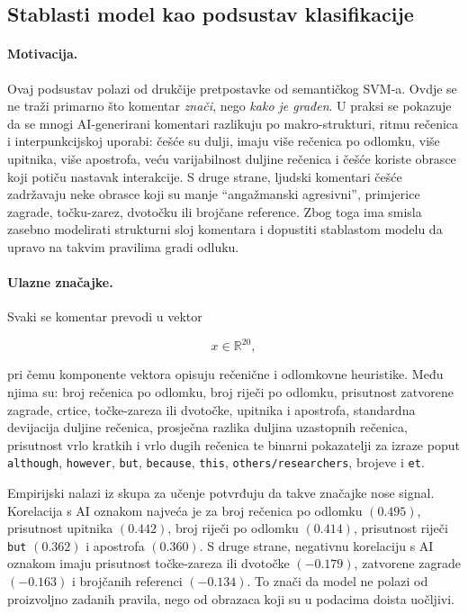 \documentclass{article}
\begin{document}
\subsection{Stablasti model kao podsustav klasifikacije}

\paragraph{Motivacija.}
Ovaj podsustav polazi od drukčije pretpostavke od semantičkog SVM-a. Ovdje se ne traži primarno što komentar \emph{znači}, nego \emph{kako je građen}. U praksi se pokazuje da se mnogi AI-generirani komentari razlikuju po makro-strukturi, ritmu rečenica i interpunkcijskoj uporabi: češće su dulji, imaju više rečenica po odlomku, više upitnika, više apostrofa, veću varijabilnost duljine rečenica i češće koriste obrasce koji potiču nastavak interakcije. S druge strane, ljudski komentari češće zadržavaju neke obrasce koji su manje ``angažmanski agresivni'', primjerice zagrade, točku-zarez, dvotočku ili brojčane reference. Zbog toga ima smisla zasebno modelirati strukturni sloj komentara i dopustiti stablastom modelu da upravo na takvim pravilima gradi odluku.

\paragraph{Ulazne značajke.}
Svaki se komentar prevodi u vektor

\[
x \in \mathbb{R}^{20},
\]

pri čemu komponente vektora opisuju rečenične i odlomkovne heuristike. Među njima su: broj rečenica po odlomku, broj riječi po odlomku, prisutnost zatvorene zagrade, crtice, točke-zareza ili dvotočke, upitnika i apostrofa, standardna devijacija duljine rečenica, prosječna razlika duljina uzastopnih rečenica, prisutnost vrlo kratkih i vrlo dugih rečenica te binarni pokazatelji za izraze poput \texttt{although}, \texttt{however}, \texttt{but}, \texttt{because}, \texttt{this}, \texttt{others/researchers}, brojeve i \texttt{et}.

Empirijski nalazi iz skupa za učenje potvrđuju da takve značajke nose signal. Korelacija s AI oznakom najveća je za broj rečenica po odlomku $(0.495)$, prisutnost upitnika $(0.442)$, broj riječi po odlomku $(0.414)$, prisutnost riječi \texttt{but} $(0.362)$ i apostrofa $(0.360)$. S druge strane, negativnu korelaciju s AI oznakom imaju prisutnost točke-zareza ili dvotočke $(-0.179)$, zatvorene zagrade $(-0.163)$ i brojčanih referenci $(-0.134)$. To znači da model ne polazi od proizvoljno zadanih pravila, nego od obrazaca koji su u podacima doista uočljivi.
\end{document}
